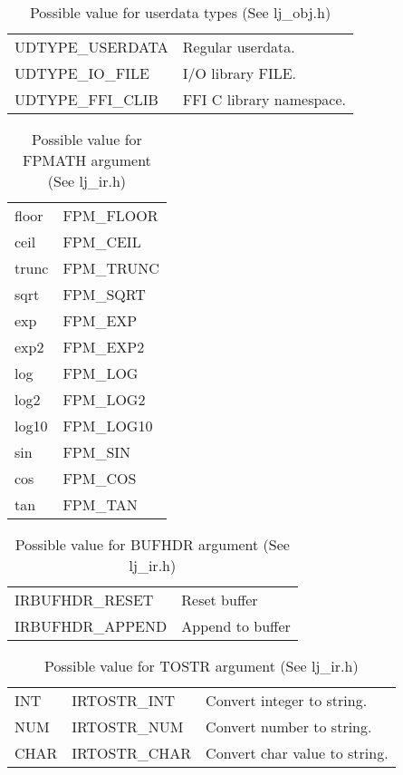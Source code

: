 \begin{table}[H]
\centering
\caption{
  Possible value for userdata types (See lj\_obj.h)
}
\label{tab:dump-udata}
\begin{tabular}{|l|l|}
\hline
UDTYPE\_USERDATA  & Regular userdata.\\
UDTYPE\_IO\_FILE  & I/O library FILE.\\
UDTYPE\_FFI\_CLIB & FFI C library namespace.\\\hline
\end{tabular}
\end{table}

\begin{table}[H]
\centering
\caption{
  Possible value for FPMATH argument (See lj\_ir.h)
}
\label{tab:dump-fpmath}
\begin{tabular}{|l|l|}
\hline
floor & FPM\_FLOOR \\
ceil  & FPM\_CEIL  \\
trunc & FPM\_TRUNC \\
sqrt  & FPM\_SQRT  \\
exp   & FPM\_EXP   \\
exp2  & FPM\_EXP2  \\
log   & FPM\_LOG   \\
log2  & FPM\_LOG2  \\
log10 & FPM\_LOG10 \\
sin   & FPM\_SIN   \\
cos   & FPM\_COS   \\
tan   & FPM\_TAN   \\
\hline
\end{tabular}
\end{table}

\begin{table}[H]
\centering
\caption{
  Possible value for BUFHDR argument (See lj\_ir.h)
}
\label{tab:dump-bufhdr}
\begin{tabular}{|l|l|}
\hline
IRBUFHDR\_RESET  & Reset buffer \\
IRBUFHDR\_APPEND & Append to buffer \\
\hline
\end{tabular}
\end{table}

\begin{table}[H]
\centering
\caption{Possible value for TOSTR argument (See lj\_ir.h)}
\label{tab:dump-tostr}
\begin{tabular}{|l|l|l|}
\hline
INT  & IRTOSTR\_INT  & Convert integer to string.  \\
NUM  & IRTOSTR\_NUM  & Convert number to string.  \\
CHAR & IRTOSTR\_CHAR & Convert char value to string.  \\\hline
\end{tabular}
\end{table}


